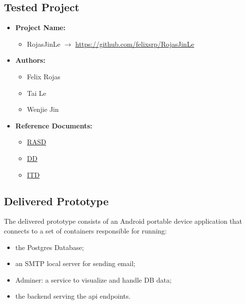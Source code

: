 \subsection{Tested Project}

\begin{itemize}
    \item \textbf{\color{titleColor}Project Name:} 
    \begin{itemize}[label= {\color{titleColor}\(\diamond\)}]
        \item RojasJinLe \(\longrightarrow\) \href{https://github.com/felixsrp/RojasJinLe}{https://github.com/felixsrp/RojasJinLe}
    \end{itemize}
    \item \textbf{\color{titleColor}Authors:} 
    \begin{itemize}[label= {\color{titleColor}\(\diamond\)}]
        \item Felix Rojas
        \item Tai Le
        \item Wenjie Jin
    \end{itemize}
    \item \textbf{\color{titleColor}Reference Documents:}
    \begin{itemize} [label= {\color{titleColor}\(\diamond\)}]
        \item \href{https://github.com/felixsrp/RojasJinLe/blob/a8bf129840a9f7ffc102c44593fcca93a684c4cb/DeliveryFolder/RASDv4.pdf}{RASD}
        \item \href{https://github.com/felixsrp/RojasJinLe/blob/a8bf129840a9f7ffc102c44593fcca93a684c4cb/DeliveryFolder/DDv3.pdf}{DD}
        \item \href{https://github.com/felixsrp/RojasJinLe/blob/a8bf129840a9f7ffc102c44593fcca93a684c4cb/DeliveryFolder/ITDv1.pdf}{ITD}
    \end{itemize}
\end{itemize}

\subsection{Delivered Prototype}
The delivered prototype consists of an Android portable device application that connects to a set of containers responsible for running:
\begin{itemize}[label= {\color{titleColor}\(\diamond\)}]
    \item the Postgres Database;
    \item an SMTP local server for sending email;
    \item Adminer: a service to visualize and handle DB data;
    \item the backend serving the api endpoints. 
\end{itemize}

